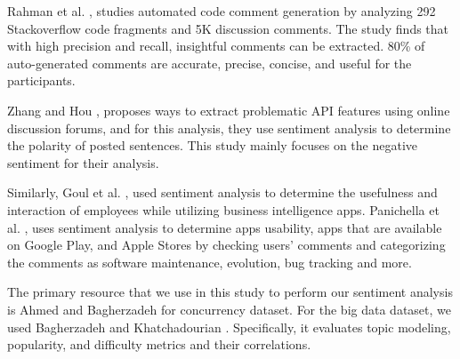 Rahman et al. \cite{rahman2015recommending}, studies automated code comment generation by analyzing 292 Stackoverflow code fragments and 5K discussion comments. The study finds that with high precision and recall, insightful comments can be extracted. 80\% of auto-generated comments are accurate, precise, concise, and useful for the participants. 


Zhang and Hou \cite{zhang2013extracting}, proposes ways to extract problematic API features using online discussion forums, and for this analysis, they use sentiment analysis to determine the polarity of posted
sentences. This study mainly focuses on the negative sentiment for their analysis. 



Similarly, Goul et al. \cite{goul2012managing}, used sentiment analysis to determine the usefulness and interaction of employees while utilizing business intelligence apps. Panichella et al. \cite{panichella2015can}, uses sentiment analysis to determine apps usability, apps that are available on Google Play, and Apple Stores by checking users' comments and categorizing the comments as software maintenance, evolution, bug tracking and more.

The primary resource that we use in this study to perform our sentiment analysis is Ahmed and Bagherzadeh \cite{ahmed2018concurrency} for concurrency dataset. For the big data dataset, we used Bagherzadeh and Khatchadourian \cite{bagherzadeh2019going}. Specifically, it evaluates topic modeling, popularity, and difficulty metrics and their correlations. 